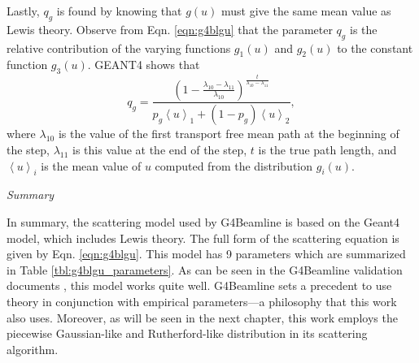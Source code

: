 Lastly, $q_g$ is found by knowing that $g(u)$ must give the same mean value as Lewis theory. Observe from Eqn. \ref{eqn:g4blgu} that the parameter $q_g$ is the relative contribution of the varying functions $g_1(u)$ and $g_2(u)$ to the constant function $g_3(u)$. GEANT4 \cite{geant4} shows that
%
\begin{equation}
q_g=\frac{(1-\frac{\lambda_{10}-\lambda_{11}}{\lambda_{10}})^{\frac{t}{\lambda_{10}-\lambda_{11}}}}{p_g\left<u\right>_1+(1-p_g)\left<u\right>_2},
\label{eqn:geantq}
\end{equation}
where $\lambda_{10}$ is the value of the first transport free mean path at the beginning of the step, $\lambda_{11}$ is this value at the end of the step, $t$ is the true path length, and $\left<u\right>_i$ is the mean value of $u$ computed from the distribution $g_i(u)$.

\noindent \textit{\large{Summary}}

In summary, the scattering model used by G4Beamline is based on the Geant4 model, which includes Lewis theory. The full form of the scattering equation is given by Eqn. \ref{eqn:g4blgu}. This model has 9 parameters which are summarized in Table \ref{tbl:g4blgu_parameters}. As can be seen in the G4Beamline validation documents \cite{g4bl}, this model works quite well. G4Beamline sets a precedent to use theory in conjunction with empirical parameters---a philosophy that this work also uses. Moreover, as will be seen in the next chapter, this work employs the piecewise Gaussian-like and Rutherford-like distribution in its scattering algorithm.
